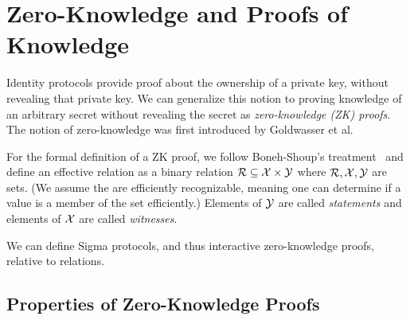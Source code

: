 \section{Zero-Knowledge and Proofs of Knowledge}
\label{sec:zknowledge}
Identity protocols provide proof about the ownership of a private key, without revealing that private key.
We can generalize this notion to proving knowledge of an arbitrary secret without revealing the secret as \emph{zero-knowledge (ZK) proofs}. 
The notion of zero-knowledge was first introduced by Goldwasser et al.~\cite{goldwasser1989knowledge}

For the formal definition of a ZK proof, we follow Boneh-Shoup's treatment~\cite{BonehShoupBook} and define an effective relation as a binary relation ${\cal R} \subseteq {\cal X} \times {\cal Y}$  where ${\cal R}, {\cal X},{\cal Y}$ are sets.
(We assume the are efficiently recognizable, meaning one can determine if a value is a member of the set efficiently.)
Elements of ${\cal Y}$ are called \emph{statements} and elements of ${\cal X}$ are called \emph{witnesses}.

We can define Sigma protocols, and thus interactive zero-knowledge proofs, relative to relations.

\begin{figure}[h]
\centering

\end{figure}

\subsection{Properties of Zero-Knowledge Proofs}


